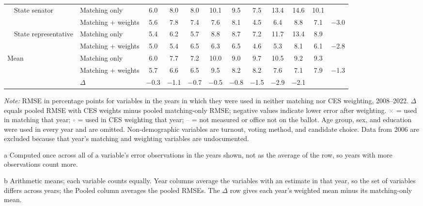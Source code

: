 \begin{table}[!htbp]
{\begin{threeparttable}
\begin{tabular}{llcccccccccc}
\addlinespace[0.1em]
~~State senator & Matching only & 6.0 & 8.0 & 8.0 & 10.1 & 9.5 & 7.5 & 13.4 & 14.6 & 10.1 & \\
 & Matching + weights & 5.6 & 7.8 & 7.4 & 7.6 & 8.1 & 4.5 & 6.4 & 8.8 & 7.1 & $-$3.0 \\
\addlinespace[0.1em]
~~State representative & Matching only & 5.4 & 6.2 & 5.7 & 8.8 & 8.7 & 7.2 & 11.7 & 13.4 & 8.9 & \\
 & Matching + weights & 5.0 & 5.4 & 6.5 & 6.3 & 6.5 & 4.6 & 5.3 & 8.1 & 6.1 & $-$2.8 \\
\midrule
Mean\tnote{b} & Matching only & 6.0 & 7.7 & 7.2 & 10.0 & 9.0 & 9.7 & 10.5 & 9.2 & 9.3 & \\
 & Matching + weights & 5.7 & 6.6 & 6.5 & 9.5 & 8.2 & 8.2 & 7.6 & 7.1 & 7.9 & $-$1.3 \\
 & $\Delta$ & $-$0.3 & $-$1.1 & $-$0.7 & $-$0.5 & $-$0.8 & $-$1.5 & $-$2.9 & $-$2.1 & & \\
\bottomrule
\end{tabular}
\begin{tablenotes}
\footnotesize
\item \textit{Note:} RMSE in percentage points for variables in the years in which they were used in neither matching nor CES weighting, 2008--2022. $\Delta$ equals pooled RMSE with CES weights minus pooled matching-only RMSE; negative values indicate lower error after weighting. \textcolor{gray}{$\times$} = used in matching that year; \textcolor{gray}{$\circ$} = used in CES weighting that year; \textcolor{gray}{--} = not measured or office not on the ballot. Age group, sex, and education were used in every year and are omitted. Non-demographic variables are turnout, voting method, and candidate choice. Data from 2006 are excluded because that year's matching and weighting variables are undocumented.
\item[a] Computed once across all of a variable's error observations in the years shown, not as the average of the row, so years with more observations count more.
\item[b] Arithmetic means; each variable counts equally. Year columns average the variables with an estimate in that year, so the set of variables differs across years; the Pooled column averages the pooled RMSEs. The $\Delta$ row gives each year's weighted mean minus its matching-only mean.
\end{tablenotes}
\end{threeparttable}%
}
\end{table}